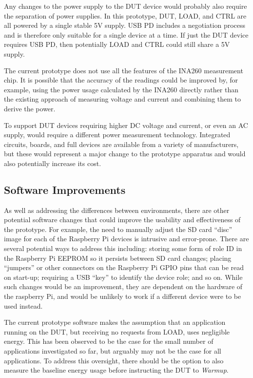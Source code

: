 Any changes to the power supply to the DUT device would probably also require the separation of power supplies. In this prototype, DUT, LOAD, and CTRL are all powered by a single stable 5V supply. USB PD includes a negotiation process and is therefore only suitable for a single device at a time. If just the DUT device requires USB PD, then potentially LOAD and CTRL could still share a 5V supply.

The current prototype does not use all the features of the INA260 measurement chip. It is possible that the accuracy of the readings could be improved by, for example, using the power usage calculated by the INA260 directly rather than the existing approach of measuring voltage and current and combining them to derive the power.

To support DUT devices requiring higher DC voltage and current, or even an AC supply, would require a different power measurement technology. Integrated circuits, boards, and full devices are available from a variety of manufacturers, but these would represent a major change to the prototype apparatus and would also potentially increase its cost.

\subsection{Software Improvements}

As well as addressing the differences between environments, there are other potential software changes that could improve the usability and effectiveness of the prototype. For example, the need to manually adjust the SD card \enquote{disc} image for each of the Raspberry Pi devices is intrusive and error-prone. There are several potential ways to address this including: storing some form of role ID in the Raspberry Pi EEPROM so it persists between SD card changes; placing \enquote{jumpers} or other connectors on the Raspberry Pi GPIO pins that can be read on start-up; requiring a USB \enquote{key} to identify the device role; and so on. While such changes would be an improvement, they are dependent on the hardware of the raspberry Pi, and would be unlikely to work if a different device were to be used instead.

The current prototype software makes the assumption that an application running on the DUT, but receiving no requests from LOAD, uses negligible energy. This has been observed to be the case for the small number of applications investigated so far, but arguably may not be the case for all applications. To address this oversight, there should be the option to also measure the baseline energy usage before instructing the DUT to \emph{Warmup}.

